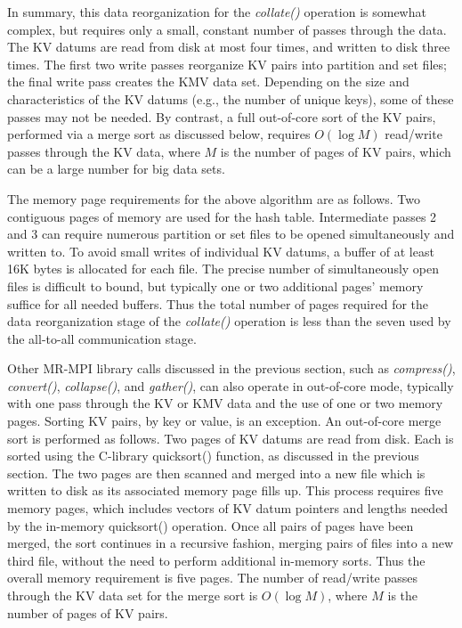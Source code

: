 In summary, this data reorganization for the {\it collate()} operation
is somewhat complex, but requires only a small, constant number of
passes through the data.  The KV datums are read from disk at most four
times, and written to disk three times.  The first two write passes
reorganize KV pairs into partition and set files; the final write pass
creates the KMV data set.  Depending on the size and characteristics
of the KV datums (e.g., the number of unique keys), some of
these passes may not be needed.  By contrast, a full out-of-core sort
of the KV pairs, performed via a merge sort as discussed below,
requires $O(\log{M})$ read/write passes through the KV data, where $M$
is the number of pages of KV pairs, which can be a large number for
big data sets.

The memory page requirements for the above algorithm are as follows.
Two contiguous pages of memory are used for the hash table.
Intermediate passes 2 and 3 can require numerous partition or set
files to be opened simultaneously and written to.  To avoid small
writes of individual KV datums, a buffer of at least 16K bytes is
allocated for each file.  The precise number of simultaneously open
files is difficult to bound, but typically one or two additional pages'
memory suffice for all needed buffers.  Thus the total number of pages required
for the data reorganization stage of the {\it collate()} operation is
less than the seven used by the all-to-all communication stage.

Other MR-MPI library calls discussed in the previous section, such as
{\it compress()}, {\it convert()}, {\it collapse()}, and {\it gather()},
can also operate in out-of-core mode, typically with one pass
through the KV or KMV data and the use of one or two memory pages.
Sorting KV pairs, by key or value, is an exception.  An out-of-core
merge sort is performed as follows.  Two pages of KV datums are read
from disk.  Each is sorted using the C-library quicksort() function,
as discussed in the previous section.  The two pages are then scanned
and merged into a new file which is written to disk as its associated
memory page fills up.  This process requires five memory pages, which
includes vectors of KV datum pointers and lengths needed by the
in-memory quicksort() operation.  Once all pairs of pages have been
merged, the sort continues in a recursive fashion, merging pairs of
files into a new third file, without the need to perform additional
in-memory sorts.  Thus the overall memory requirement is five pages.  The
number of read/write passes through the KV data set for the merge sort
is $O(\log{M})$, where $M$ is the number of pages of KV pairs.
